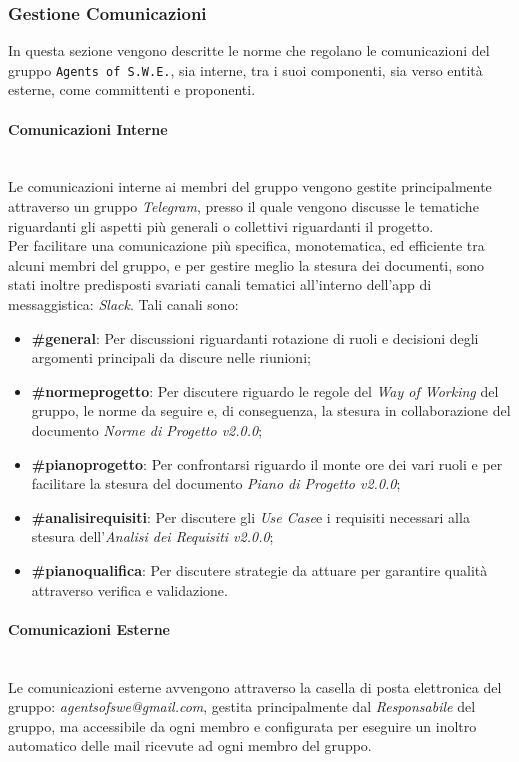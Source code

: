 \subsubsection{Gestione Comunicazioni}
	In questa sezione vengono descritte le norme che regolano le comunicazioni del gruppo \texttt{Agents of S.W.E.}, 		sia interne, tra i suoi componenti, sia verso entità esterne, come committenti e proponenti.

\paragraph{Comunicazioni Interne} ~\\
	Le comunicazioni interne ai membri del gruppo vengono gestite principalmente attraverso un gruppo 										\textit{Telegram}\glossario, presso il quale vengono discusse le tematiche riguardanti gli aspetti più generali o collettivi riguardanti il progetto. \\
	Per facilitare una comunicazione più specifica, monotematica, ed efficiente tra alcuni membri del gruppo, e per 			gestire meglio la stesura dei documenti, sono stati inoltre predisposti svariati canali tematici all'interno 				dell'app di messaggistica: \textit{Slack}\glossario. Tali canali sono:
	\begin{itemize}
	\item \textbf{\#general}: Per discussioni riguardanti rotazione di ruoli e decisioni degli argomenti principali 				da discure nelle riunioni;
	\item \textbf{\#normeprogetto}: Per discutere riguardo le regole del \textit{Way of Working} del gruppo, le norme 		da seguire e, di conseguenza, la stesura in collaborazione del documento \textit{Norme di Progetto v2.0.0};
	\item \textbf{\#pianoprogetto}: Per confrontarsi riguardo il monte ore dei vari ruoli e per facilitare la stesura 		del documento \textit{Piano di Progetto v2.0.0};
	\item \textbf{\#analisirequisiti}: Per discutere gli \textit{Use Case}\glossario e i requisiti necessari alla 				stesura dell'\textit{Analisi dei Requisiti v2.0.0};
	\item \textbf{\#pianoqualifica}: Per discutere strategie da attuare per garantire qualità attraverso 									verifica e validazione.
	\end{itemize}

\paragraph{Comunicazioni Esterne} ~\\
	Le comunicazioni esterne avvengono attraverso la casella di posta elettronica del gruppo: 														\textit{agentsofswe@gmail.com}, gestita principalmente dal \textit{Responsabile} del gruppo, ma accessibile da 			ogni membro e configurata per eseguire un inoltro automatico delle mail ricevute ad ogni membro del gruppo.


